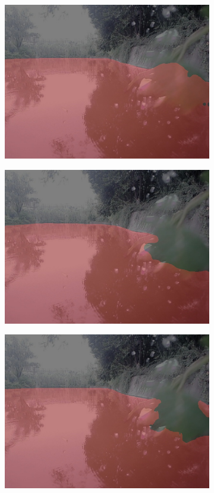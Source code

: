 \documentclass[cn,12pt,color=mine,scheme=chinese,bibstyle=gb7714-2015]{elegantbook}
\begin{document}
\begin{figure}[h]
\begin{subfigure}[b]{0.23\linewidth}
		\centering\includegraphics[width=\linewidth]{results2/test5deeplab}
	\end{subfigure}
	\begin{subfigure}[b]{0.23\linewidth}
		\centering\includegraphics[width=\linewidth]{results2/test5setr}
	\end{subfigure}
	\begin{subfigure}[b]{0.23\linewidth}
		\centering\includegraphics[width=\linewidth]{results2/test5segformer}

\end{subfigure}
\end{figure}
\end{document}
